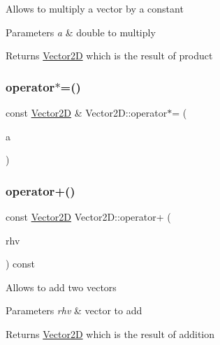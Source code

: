Allows to multiply a vector by a constant 
\begin{DoxyParams}{Parameters}
{\em a} & double to multiply \\
\hline
\end{DoxyParams}
\begin{DoxyReturn}{Returns}
\hyperlink{class_vector2_d}{Vector2D} which is the result of product 
\end{DoxyReturn}
\hypertarget{class_vector2_d_a9ec785cca2a48d62596dfdbfa0546267}{}\label{class_vector2_d_a9ec785cca2a48d62596dfdbfa0546267} 
\subsubsection{\texorpdfstring{operator$\ast$=()}{operator*=()}}
{\footnotesize\ttfamily const \hyperlink{class_vector2_d}{Vector2D} \& Vector2\+D\+::operator$\ast$= (\begin{DoxyParamCaption}\item[{const double \&}]{a }\end{DoxyParamCaption})}

\hypertarget{class_vector2_d_a068660b7b836163e6a417c8fb283022b}{}\label{class_vector2_d_a068660b7b836163e6a417c8fb283022b} 
\subsubsection{\texorpdfstring{operator+()}{operator+()}}
{\footnotesize\ttfamily const \hyperlink{class_vector2_d}{Vector2D} Vector2\+D\+::operator+ (\begin{DoxyParamCaption}\item[{const \hyperlink{class_vector2_d}{Vector2D} \&}]{rhv }\end{DoxyParamCaption}) const}

Allows to add two vectors 
\begin{DoxyParams}{Parameters}
{\em rhv} & vector to add \\
\hline
\end{DoxyParams}
\begin{DoxyReturn}{Returns}
\hyperlink{class_vector2_d}{Vector2D} which is the result of addition 
\end{DoxyReturn}
\hypertarget{class_vector2_d_a5e4dc932362899c8e7bf8b0caea1c9a9}{}\label{class_vector2_d_a5e4dc932362899c8e7bf8b0caea1c9a9} 
